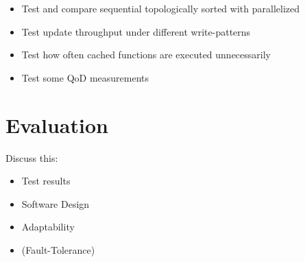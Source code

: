 \begin{itemize}
  \item Test and compare sequential topologically sorted with parallelized
  \item Test update throughput under different write-patterns
  \item Test how often cached functions are executed unnecessarily
  \item Test some QoD measurements
\end{itemize}



\section{Evaluation}
\label{sec:evaluation}

Discuss this:

\begin{itemize}
  \item Test results
  \item Software Design
  \item Adaptability
  \item (Fault-Tolerance)
\end{itemize}







